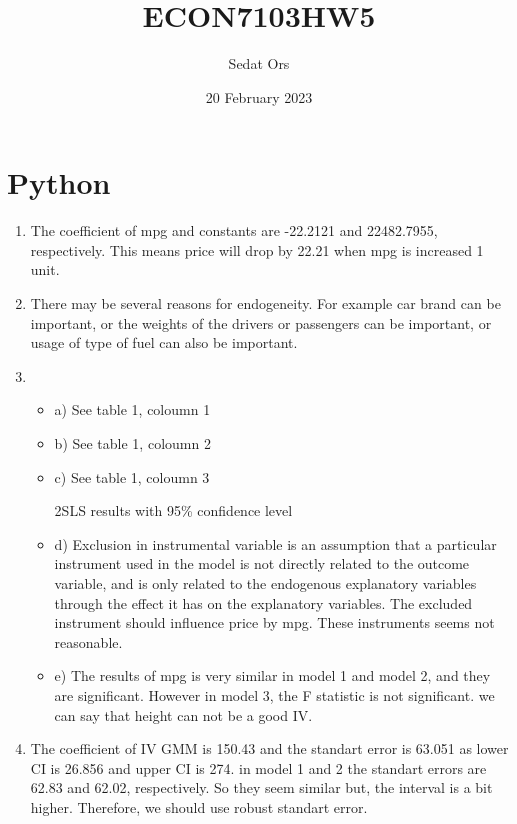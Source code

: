 \documentclass{article}
\title{ECON7103HW5}
\author{Sedat Ors}
\date{20 February 2023}
\begin{document}
\maketitle

\section{Python}
\vspace{0.5cm}
\begin{enumerate}

\item The coefficient of mpg and constants are -22.2121 and 22482.7955, respectively. This means price will drop by 22.21 when mpg is increased 1 unit.

\item There may be several reasons for endogeneity. For example car brand can be important, or the weights of the drivers or passengers can be important, or usage of type of fuel can also be important. 

\item
\begin{itemize}
    \item a) See table 1, coloumn 1
    \item b) See table 1, coloumn 2
    \item c) See table 1, coloumn 3
    \begin{table}[]
  \centering
    
    \caption{2SLS results with 95\% confidence level}
    \label{tab:question3}
\end{table}
  

\item d) Exclusion in instrumental variable is  an assumption that a particular instrument used in the model is not directly related to the outcome variable, and is only related to the endogenous explanatory variables through the effect it has on the explanatory variables. The excluded instrument should influence price by mpg. These instruments seems not reasonable.

\item e) The results of mpg is very similar in model 1 and model 2, and they are significant. However in model 3, the F statistic is not significant. we can say that height can not be a good IV. 

\end{itemize}


\item The coefficient of IV GMM is 150.43 and the standart error is 63.051 as lower CI is 26.856 and upper CI is 274. in model 1 and 2 the standart errors are 62.83 and 62.02, respectively. So they seem similar but, the interval is a bit higher. Therefore, we should use robust standart error. 




\end{enumerate}
\end{document}
